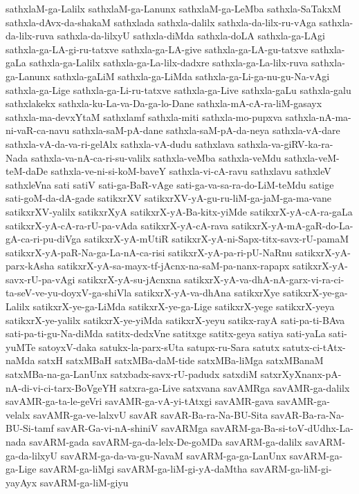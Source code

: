 {sathxlaM-ga-Lalilx
sathxlaM-ga-Lanunx
sathxlaM-ga-LeMba
sathxla-SaTakxM
sathxla-dAvx-da-shakaM
sathxlada
sathxla-dalilx
sathxla-da-lilx-ru-vAga
sathxla-da-lilx-ruva
sathxla-da-lilxyU
sathxla-diMda
sathxla-doLA
sathxla-ga-LAgi
sathxla-ga-LA-gi-ru-tatxve
sathxla-ga-LA-give
sathxla-ga-LA-gu-tatxve
sathxla-gaLa
sathxla-ga-Lalilx
sathxla-ga-La-lilx-dadxre
sathxla-ga-La-lilx-ruva
sathxla-ga-Lanunx
sathxla-gaLiM
sathxla-ga-LiMda
sathxla-ga-Li-ga-nu-gu-Na-vAgi
sathxla-ga-Lige
sathxla-ga-Li-ru-tatxve
sathxla-ga-Live
sathxla-gaLu
sathxla-galu
sathxlakekx
sathxla-ku-La-va-Da-ga-lo-Dane
sathxla-mA-cA-ra-liM-gasayx
sathxla-ma-devxYtaM
sathxlamf
sathxla-miti
sathxla-mo-pupxva
sathxla-nA-ma-ni-vaR-ca-navu
sathxla-saM-pA-dane
sathxla-saM-pA-da-neya
sathxla-vA-dare
sathxla-vA-da-va-ri-gelAlx
sathxla-vA-dudu
sathxlava
sathxla-va-giRV-ka-ra-Nada
sathxla-va-nA-ca-ri-su-valilx
sathxla-veMba
sathxla-veMdu
sathxla-veM-teM-daDe
sathxla-ve-ni-si-koM-baveY
sathxla-vi-cA-ravu
sathxlavu
sathxleV
sathxleVna
sati
satiV
sati-ga-BaR-vAge
sati-ga-va-sa-ra-do-LiM-teMdu
satige
sati-goM-da-dA-gade
satikxrXV
satikxrXV-yA-gu-ru-liM-ga-jaM-ga-ma-vane
satikxrXV-yalilx
satikxrXyA
satikxrX-yA-Ba-kitx-yiMde
satikxrX-yA-cA-ra-gaLa
satikxrX-yA-cA-ra-rU-pa-vAda
satikxrX-yA-cA-rava
satikxrX-yA-mA-gaR-do-La-gA-ca-ri-pu-diVga
satikxrX-yA-mUtiR
satikxrX-yA-ni-Sapx-titx-savx-rU-pamaM
satikxrX-yA-paR-Na-ga-La-nA-ca-risi
satikxrX-yA-pa-ri-pU-NaRnu
satikxrX-yA-parx-kAsha
satikxrX-yA-sa-mayx-tf-jAcnx-na-saM-pa-nanx-rapapx
satikxrX-yA-savx-rU-pa-vAgi
satikxrX-yA-su-jAcnxna
satikxrX-yA-va-dhA-nA-garx-vi-ra-ci-ta-seV-ve-yu-doyxV-ga-shiVla
satikxrX-yA-va-dhAna
satikxrXye
satikxrX-ye-ga-Lalilx
satikxrX-ye-ga-LiMda
satikxrX-ye-ga-Lige
satikxrX-yege
satikxrX-yeya
satikxrX-ye-yalilx
satikxrX-ye-yiMda
satikxrX-yeyu
satikx-rayA
sati-pa-ti-BAva
sati-pa-ti-gu-Na-diMda
satitx-dedxVne
satitxge
satitx-geya
satiya
sati-yaLa
sati-yuMTe
satoyxV-daka
satukx-la-parx-sUta
satupx-ru-Sara
satutx
satutx-ci-tAtx-naMda
satxH
satxMBaH
satxMBa-daM-tide
satxMBa-liMga
satxMBanaM
satxMBa-na-ga-LanUnx
satxbadx-savx-rU-padudx
satxdiM
satxrXyXnanx-pA-nA-di-vi-ci-tarx-BoVgeYH
satxra-ga-Live
satxvana
savAMRga
savAMR-ga-dalilx
savAMR-ga-ta-le-geVri
savAMR-ga-vA-yi-tAtxgi
savAMR-gava
savAMR-ga-velalx
savAMR-ga-ve-lalxvU
savAR
savAR-Ba-ra-Na-BU-Sita
savAR-Ba-ra-Na-BU-Si-tamf
savAR-Ga-vi-nA-shiniV
savARMga
savARM-ga-Ba-si-toV-dUdhx-La-nada
savARM-gada
savARM-ga-da-lelx-De-goMDa
savARM-ga-dalilx
savARM-ga-da-lilxyU
savARM-ga-da-va-gu-NavaM
savARM-ga-ga-LanUnx
savARM-ga-ga-Lige
savARM-ga-liMgi
savARM-ga-liM-gi-yA-daMtha
savARM-ga-liM-gi-yayAyx
savARM-ga-liM-giyu
}
